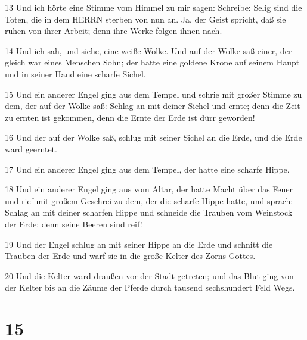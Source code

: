 \par 13 Und ich hörte eine Stimme vom Himmel zu mir sagen: Schreibe: Selig sind die Toten, die in dem HERRN sterben von nun an. Ja, der Geist spricht, daß sie ruhen von ihrer Arbeit; denn ihre Werke folgen ihnen nach.
\par 14 Und ich sah, und siehe, eine weiße Wolke. Und auf der Wolke saß einer, der gleich war eines Menschen Sohn; der hatte eine goldene Krone auf seinem Haupt und in seiner Hand eine scharfe Sichel.
\par 15 Und ein anderer Engel ging aus dem Tempel und schrie mit großer Stimme zu dem, der auf der Wolke saß: Schlag an mit deiner Sichel und ernte; denn die Zeit zu ernten ist gekommen, denn die Ernte der Erde ist dürr geworden!
\par 16 Und der auf der Wolke saß, schlug mit seiner Sichel an die Erde, und die Erde ward geerntet.
\par 17 Und ein anderer Engel ging aus dem Tempel, der hatte eine scharfe Hippe.
\par 18 Und ein anderer Engel ging aus vom Altar, der hatte Macht über das Feuer und rief mit großem Geschrei zu dem, der die scharfe Hippe hatte, und sprach: Schlag an mit deiner scharfen Hippe und schneide die Trauben vom Weinstock der Erde; denn seine Beeren sind reif!
\par 19 Und der Engel schlug an mit seiner Hippe an die Erde und schnitt die Trauben der Erde und warf sie in die große Kelter des Zorns Gottes.
\par 20 Und die Kelter ward draußen vor der Stadt getreten; und das Blut ging von der Kelter bis an die Zäume der Pferde durch tausend sechshundert Feld Wegs.

\chapter{15}

